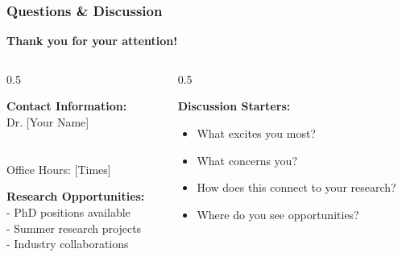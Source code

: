 \documentclass[aspectratio=169,10pt]{beamer}
\newcommand{\slideheader}[1]{\frametitle{#1}}
\theoremstyle{plain}
\begin{document}
\begin{frame}
  \slideheader{Questions \& Discussion}
  
  \begin{center}
    \textbf{\Large Thank you for your attention!}
  \end{center}
  
  \vspace{1cm}
  
  \begin{columns}
    \begin{column}{0.5\textwidth}
      \begin{blueBox}
        \textbf{Contact Information:}\\
        Dr. [Your Name]\\
        [Your Email]\\
        [Your Institution]\\
        Office Hours: [Times]
      \end{blueBox}
      
      \vspace{0.5cm}
      
      \begin{greenBox}
        \textbf{Research Opportunities:}\\
        - PhD positions available\\
        - Summer research projects\\
        - Industry collaborations
      \end{greenBox}
    \end{column}
    
    \begin{column}{0.5\textwidth}
      \begin{center}
      \end{center}
      
      \vspace{0.5cm}
      
      \textbf{Discussion Starters:}
      \begin{itemize}
        \item What excites you most?
        \item What concerns you?
        \item How does this connect to your research?
        \item Where do you see opportunities?
      \end{itemize}
    \end{column}
  \end{columns}
  

\end{frame}
\end{document}
